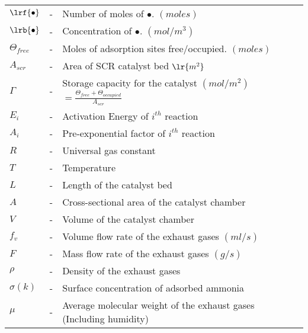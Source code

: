 \begin{table}[H]
\centering
\begin{tabular}{l c l}
    {$\lrf{\bullet}$}&-&{Number of moles of $\bullet$. $(moles)$}\\
    {$\lrb{\bullet}$}&-&{Concentration of $\bullet$. $(mol/m^3)$}\\
    {$\Theta_{free}$}&-&{Moles of adsorption sites free/occupied. $(moles)$}\\
    {$A_{scr}$}&-&{Area of SCR catalyst bed $\lr{m^2}$ }\\
    {$\Gamma $}&-&{Storage capacity for the catalyst $(mol/m^2)$ $= \frac{\Theta_{free} + \Theta_{occupied}}{A_{scr}}$}\\
    {$E_i$}&-&{Activation Energy of $i^{th}$ reaction}\\
    {$A_i$}&-&{Pre-exponential factor of $i^{th}$ reaction} \\
    {$R$}&-&{Universal gas constant}\\
    {$T$}&-&{Temperature}\\
    {$L$}&-&{Length of the catalyst bed} \\
    {$A$}&-&{Cross-sectional area of the catalyst chamber} \\
    {$V$}&-&{Volume of the catalyst chamber} \\
    {$f_v$}&-&{Volume flow rate of the exhaust gases $(ml/s)$} \\
    {$F$}&-&{Mass flow rate of the exhaust gases $(g/s)$} \\
    {$\rho$}&-&{Density of the exhaust gases} \\
    {$\sigma(k)$}&-&{Surface concentration of adsorbed ammonia} \\
    {$\mu$}&-&{Average molecular weight of the exhaust gases (Including humidity)}
\end{tabular}
\end{table}
